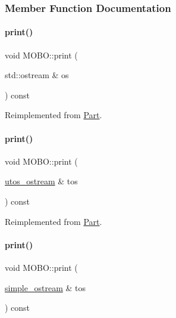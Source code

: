 \subsubsection{Member Function Documentation}
\mbox{\label{class_m_o_b_o_a3241f425030e01d5b7a192c23af2dbda}} 
\paragraph{\texorpdfstring{print()}{print()}\hspace{0.1cm}{\footnotesize\ttfamily [1/4]}}
{\footnotesize\ttfamily void M\+O\+B\+O\+::print (\begin{DoxyParamCaption}\item[{std\+::ostream \&}]{os }\end{DoxyParamCaption}) const\hspace{0.3cm}{\ttfamily [virtual]}}



Reimplemented from \mbox{\hyperlink{class_part_a4fa402b8e8fd4236ff773a7697ab2bc3}{Part}}.

\mbox{\label{class_m_o_b_o_a4c78cec3a2a3e4d4480855622f50bd06}} 
\paragraph{\texorpdfstring{print()}{print()}\hspace{0.1cm}{\footnotesize\ttfamily [2/4]}}
{\footnotesize\ttfamily void M\+O\+B\+O\+::print (\begin{DoxyParamCaption}\item[{\mbox{\hyperlink{structutos__ostream}{utos\+\_\+ostream}} \&}]{tos }\end{DoxyParamCaption}) const\hspace{0.3cm}{\ttfamily [virtual]}}



Reimplemented from \mbox{\hyperlink{class_part_a9ecabe44ba3415badf82c6a23617a41e}{Part}}.

\mbox{\label{class_m_o_b_o_a01fed4470cbf8c58f86426aa8f52b225}} 
\paragraph{\texorpdfstring{print()}{print()}\hspace{0.1cm}{\footnotesize\ttfamily [3/4]}}
{\footnotesize\ttfamily void M\+O\+B\+O\+::print (\begin{DoxyParamCaption}\item[{\mbox{\hyperlink{structsimple__ostream}{simple\+\_\+ostream}} \&}]{tos }\end{DoxyParamCaption}) const\hspace{0.3cm}{\ttfamily [virtual]}}



